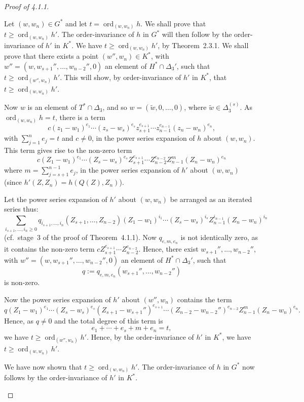 \documentclass[11pt]{article}
\theoremstyle{plain}
\theoremstyle{definition}
\DeclareMathOperator{\ord}{ord}
\begin{document}
\begin{proof}[Proof of 4.1.1]
\begin{enumerate}
Let $(w, w_n) \in G^*$ and let $t = \ord_{(w, w_n)} h$. We shall prove
that $t \ge \ord_{(w, w_n)} h'$. The order-invariance of $h$ in $G^*$
will then follow by the order-invariance of $h'$ in $K^*$. We have
$t \ge \ord_{(w, w_n)} h'$, by Theorem~2.3.1. We shall prove that
there exists a point $(w'', w_n) \in K^*$, with
$w'' = (w, w_{s+1}'', \ldots, w_{n-2}'', 0)$ an element of
$H^* \cap \Delta_3'$, such that $t \ge \ord_{(w'', w_n)} h'$. This
will show, by order-invariance of $h'$ in $K^*$, that
$t \ge \ord_{(w, w_n)} h'$.

Now $w$ is an element of $T^* \cap \Delta_3$, and so
$w = (\tilde{w}, 0, \ldots, 0)$, where $\tilde{w} \in \Delta_3^{(s)}$.
As $\ord_{(w, w_n)} h = t$, there is a term
\[
c (z_1 - w_1)^{e_1} \cdots (z_s - w_s)^{e_s}
z_{s+1}^{e_{s+1}} \cdots z_{n-1}^{e_{n-1}} (z_n - w_n)^{e_n},
\]
with $\sum_{j=1}^{n} e_j = t$ and $c \ne 0$, in the power series
expansion of $h$ about $(w, w_n)$. This term gives rise to the
non-zero term
\[
c (Z_1 - w_1)^{e_1} \cdots (Z_s - w_s)^{e_s}
Z_{s+1}^{e_{s+1}} \cdots Z_{n-2}^{e_{n-2}} Z_{n-1}^m
(Z_n - w_n)^{e_n}
\]
where $m = \sum_{j=s+1}^{n-1} e_j$, in the power series expansion of
$h'$ about $(w, w_n)$ (since $h'(Z, Z_n) = h(Q(Z), Z_n)$).

Let the power series expansion of $h'$ about $(w, w_n)$ be arranged
as an iterated series thus:
\[
\sum_{i_{s+1}, \ldots, i_n \ge 0}
q_{i_{s+1}, \ldots, i_n}(Z_{s+1}, \ldots, Z_{n-2})
(Z_1 - w_1)^{i_1} \cdots (Z_s - w_s)^{i_s}
Z_{n-1}^{i_{n-1}} (Z_n - w_n)^{i_n}
\]
(cf.\ stage~3 of the proof of Theorem~4.1.1). Now
$q_{e, m, e_n}$ is not identically zero, as it contains the non-zero
term $c Z_{s+1}^{e_{s+1}} \cdots Z_{n-2}^{e_{n-2}}$. Hence, there
exist $w_{s+1}'', \ldots, w_{n-2}''$, with
$w'' = (w, w_{s+1}'', \ldots, w_{n-2}'', 0)$ an element of
$H^* \cap \Delta_3'$, such that
\[
q := q_{e, m, e_n}(w_{s+1}'', \ldots, w_{n-2}'')
\]
is non-zero.

Now the power series expansion of $h'$ about $(w'', w_n)$ contains
the term
\[
q (Z_1 - w_1)^{e_1} \cdots (Z_s - w_s)^{e_s}
(Z_{s+1} - w_{s+1}'')^{e_{s+1}} \cdots (Z_{n-2} - w_{n-2}'')^{e_{n-2}}
Z_{n-1}^m (Z_n - w_n)^{e_n}.
\]
Hence, as $q \ne 0$ and the total degree of this term is
\[
e_1 + \cdots + e_s + m + e_n = t,
\]
we have $t \ge \ord_{(w'', w_n)} h'$. Hence, by the order-invariance
of $h'$ in $K^*$, we have $t \ge \ord_{(w, w_n)} h'$.

We have now shown that $t \ge \ord_{(w, w_n)} h'$. The
order-invariance of $h$ in $G^*$ now follows by the order-invariance
of $h'$ in $K^*$.
\end{enumerate}
\end{proof}
\end{document}
